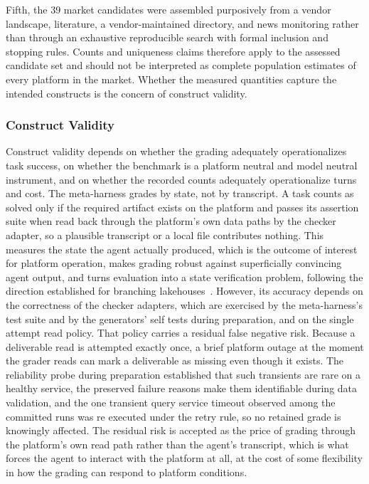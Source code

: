 \documentclass[
english,                 %
bibtex,                  %
]{kththesis}
\numberwithin{listing}{chapter}
\begin{document}
Fifth, the 39 market candidates were assembled purposively from a vendor landscape, literature, a vendor-maintained directory, and news monitoring rather than through an exhaustive reproducible search with formal inclusion and stopping rules. Counts and uniqueness claims therefore apply to the assessed candidate set and should not be interpreted as complete population estimates of every platform in the market. Whether the measured quantities capture the intended constructs is the concern of construct validity.

\subsubsection{Construct Validity}
\label{sec:method_construct_validity}

Construct validity depends on whether the grading adequately operationalizes task success, on whether the benchmark is a platform neutral and model neutral instrument, and on whether the recorded counts adequately operationalize turns and cost. The meta-harness grades by state, not by transcript. A task counts as solved only if the required artifact exists on the platform and passes its assertion suite when read back through the platform's own data paths by the checker adapter, so a plausible transcript or a local file contributes nothing. This measures the state the agent actually produced, which is the outcome of interest for platform operation, makes grading robust against superficially convincing agent output, and turns evaluation into a state verification problem, following the direction established for branching lakehouses~\cite{schneider_skill_2026}. However, its accuracy depends on the correctness of the checker adapters, which are exercised by the meta-harness's test suite and by the generators' self tests during preparation, and on the single attempt read policy. That policy carries a residual false negative risk. Because a deliverable read is attempted exactly once, a brief platform outage at the moment the grader reads can mark a deliverable as missing even though it exists. The reliability probe during preparation established that such transients are rare on a healthy service, the preserved failure reasons make them identifiable during data validation, and the one transient query service timeout observed among the committed runs was re executed under the retry rule, so no retained grade is knowingly affected. The residual risk is accepted as the price of grading through the platform's own read path rather than the agent's transcript, which is what forces the agent to interact with the platform at all, at the cost of some flexibility in how the grading can respond to platform conditions.
\end{document}
